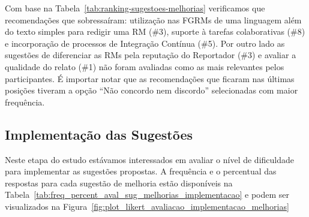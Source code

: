 Com base na Tabela~\ref{tab:ranking-sugestoes-melhorias} verificamos que
recomendações que sobressaíram: utilização nas FGRMs de uma linguagem além do
texto simples para redigir uma RM (\#3), suporte à tarefas colaborativas (\#8)
e incorporação de processos de Integração Contínua (\#5). Por outro lado as
sugestões de diferenciar as RMs pela reputação do Reportador (\#3) e avaliar a
qualidade do relato (\#1) não foram avaliadas como as mais relevantes pelos
participantes. É importar notar que as recomendações que ficaram nas últimas
posições tiveram a opção ``Não concordo nem discordo'' selecionadas com maior
frequência.

\begin{table}[htpb]
\centering
{}
\caption{Ranking das sugestões propostas}\label{tab:ranking-sugestoes-melhorias}
\end{table}

\subsection{Implementação das Sugestões}\label{sub:sug_melhorias_resultados_implementacao}

Neste etapa do estudo estávamos interessados em avaliar o nível de dificuldade
para implementar as sugestões propostas. A frequência e o percentual das
respostas para cada sugestão de melhoria estão disponíveis na
Tabela~\ref{tab:freq_percent_aval_sug_melhorias_implementacao} e podem ser
visualizados na Figura~\ref{fig:plot_likert_avaliacao_implementacao_melhorias}

